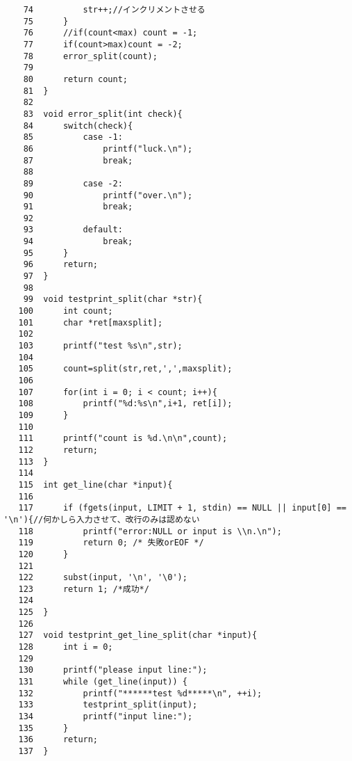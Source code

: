 \documentclass[a4j,11pt]{jarticle}
\begin{document}
{\begin{verbatim}
    74		    str++;//インクリメントさせる  
    75	    }
    76	    //if(count<max) count = -1;
    77	    if(count>max)count = -2;
    78	    error_split(count);
    79	    
    80	    return count;
    81	}
    82	
    83	void error_split(int check){
    84	    switch(check){
    85	        case -1:
    86	            printf("luck.\n");
    87	            break;
    88	        
    89	        case -2:
    90	            printf("over.\n");
    91	            break;
    92	        
    93	        default:
    94	            break;
    95	    }
    96	    return;
    97	}
    98	
    99	void testprint_split(char *str){
   100	    int count;
   101	    char *ret[maxsplit];
   102	    
   103	    printf("test %s\n",str);
   104	    
   105	    count=split(str,ret,',',maxsplit);
   106	    
   107	    for(int i = 0; i < count; i++){
   108	        printf("%d:%s\n",i+1, ret[i]);
   109	    }
   110	    
   111	    printf("count is %d.\n\n",count);
   112	    return;
   113	}
   114	
   115	int get_line(char *input){
   116	
   117	    if (fgets(input, LIMIT + 1, stdin) == NULL || input[0] == '\n'){//何かしら入力させて、改行のみは認めない
   118	        printf("error:NULL or input is \\n.\n");
   119	        return 0; /* 失敗orEOF */
   120	    }
   121	
   122	    subst(input, '\n', '\0');
   123	    return 1; /*成功*/
   124	
   125	}
   126	
   127	void testprint_get_line_split(char *input){
   128	    int i = 0;
   129	
   130	    printf("please input line:");
   131	    while (get_line(input)) {
   132	        printf("******test %d*****\n", ++i);
   133	        testprint_split(input);
   134	        printf("input line:");
   135	    }
   136	    return;
   137	}

\end{verbatim}
}  %
\end{document}
